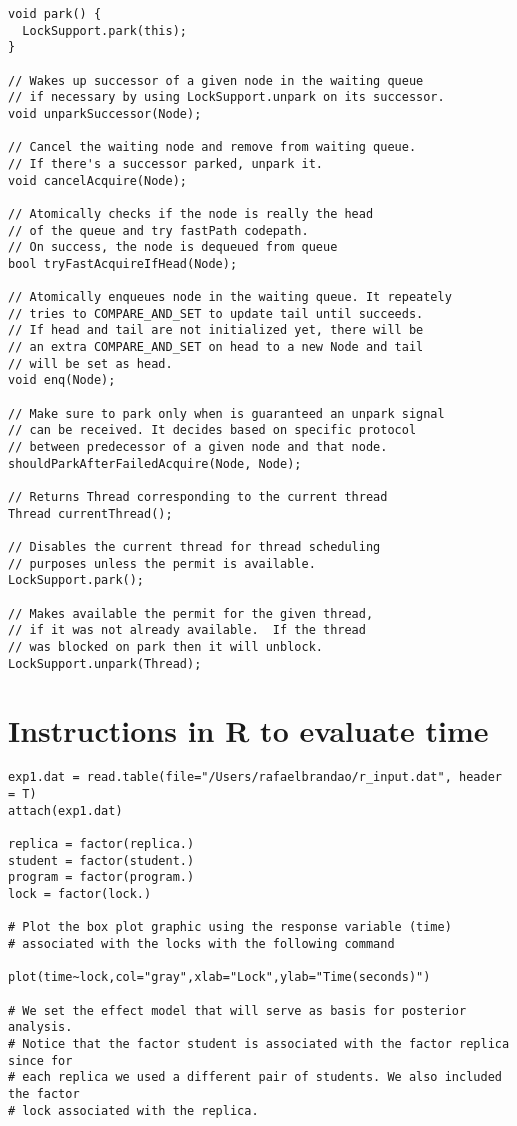 \begin{appendices}
\begin{verbatim}
void park() {
  LockSupport.park(this);
}

// Wakes up successor of a given node in the waiting queue
// if necessary by using LockSupport.unpark on its successor.
void unparkSuccessor(Node);

// Cancel the waiting node and remove from waiting queue.
// If there's a successor parked, unpark it.
void cancelAcquire(Node);

// Atomically checks if the node is really the head
// of the queue and try fastPath codepath.
// On success, the node is dequeued from queue
bool tryFastAcquireIfHead(Node);

// Atomically enqueues node in the waiting queue. It repeately
// tries to COMPARE_AND_SET to update tail until succeeds.
// If head and tail are not initialized yet, there will be
// an extra COMPARE_AND_SET on head to a new Node and tail
// will be set as head.
void enq(Node);

// Make sure to park only when is guaranteed an unpark signal
// can be received. It decides based on specific protocol
// between predecessor of a given node and that node.
shouldParkAfterFailedAcquire(Node, Node);

// Returns Thread corresponding to the current thread
Thread currentThread();

// Disables the current thread for thread scheduling
// purposes unless the permit is available.
LockSupport.park();

// Makes available the permit for the given thread,
// if it was not already available.  If the thread
// was blocked on park then it will unblock.
LockSupport.unpark(Thread);
\end{verbatim}


\chapter{Instructions in R to evaluate time}
\noindent
\begin{verbatim}
exp1.dat = read.table(file="/Users/rafaelbrandao/r_input.dat", header = T)
attach(exp1.dat)

replica = factor(replica.)
student = factor(student.)
program = factor(program.)
lock = factor(lock.)

# Plot the box plot graphic using the response variable (time)
# associated with the locks with the following command

plot(time~lock,col="gray",xlab="Lock",ylab="Time(seconds)")

# We set the effect model that will serve as basis for posterior analysis.
# Notice that the factor student is associated with the factor replica since for
# each replica we used a different pair of students. We also included the factor
# lock associated with the replica.


\end{verbatim}
\end{appendices}
